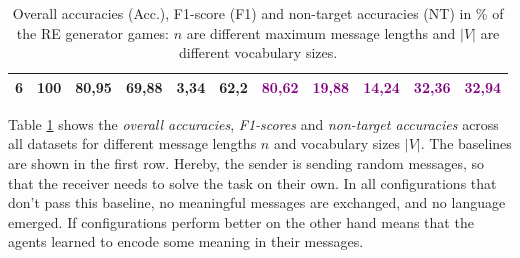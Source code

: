\begin{table}[ht]
\begin{tabular}{cc|ccc|ccc|ccc}
        {6}                           & {100}  & {\textbf{80,95}}                    & {\textbf{69,88}}                    & {\textbf{3,34}}                          & {62,2}                    & \textcolor{purple}{80,62} & \textcolor{purple}{19,88} & \textcolor{purple}{14,24} & \textcolor{purple}{32,36} & \textcolor{purple}{32,94} \\
        \bottomrule
    \end{tabular}
    \caption{Overall accuracies (Acc.), F1-score (F1) and non-target accuracies (NT) in \% of the RE generator games: $n$ are different maximum message lengths and $|V|$ are different vocabulary sizes.}
    \label{tab:results:re-generator-game}
\end{table}

Table \ref{tab:results:re-generator-game} shows the \emph{overall accuracies}, \emph{F1-scores} and \emph{non-target accuracies} across all datasets for different message lengths $n$ and vocabulary sizes $|V|$.
The baselines are shown in the first row.
Hereby, the sender is sending random messages, so that the receiver needs to solve the task on their own.
In all configurations that don't pass this baseline, no meaningful messages are exchanged, and no language emerged.
If configurations perform better on the other hand means that the agents learned to encode some meaning in their messages.

